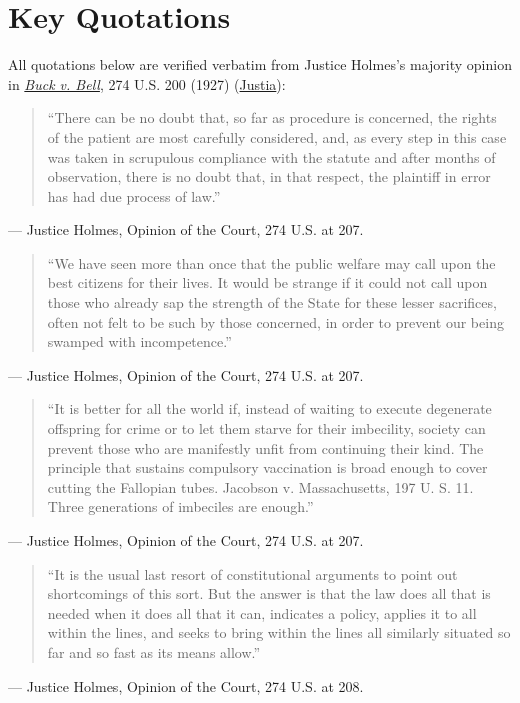 \documentclass[12pt]{article}
\begin{document}
\section{Key Quotations}

All quotations below are verified verbatim from Justice Holmes's majority opinion in \href{https://www.courtlistener.com/opinion/101076/buck-v-bell/}{\textit{Buck v. Bell}}, 274 U.S. 200 (1927) (\href{https://supreme.justia.com/cases/federal/us/274/200/}{Justia}):

\begin{quote}
``There can be no doubt that, so far as procedure is concerned, the rights of the patient are most carefully considered, and, as every step in this case was taken in scrupulous compliance with the statute and after months of observation, there is no doubt that, in that respect, the plaintiff in error has had due process of law.''
\end{quote}
\noindent --- Justice Holmes, Opinion of the Court, 274 U.S. at 207.

\begin{quote}
``We have seen more than once that the public welfare may call upon the best citizens for their lives. It would be strange if it could not call upon those who already sap the strength of the State for these lesser sacrifices, often not felt to be such by those concerned, in order to prevent our being swamped with incompetence.''
\end{quote}
\noindent --- Justice Holmes, Opinion of the Court, 274 U.S. at 207.

\begin{quote}
``It is better for all the world if, instead of waiting to execute degenerate offspring for crime or to let them starve for their imbecility, society can prevent those who are manifestly unfit from continuing their kind. The principle that sustains compulsory vaccination is broad enough to cover cutting the Fallopian tubes. Jacobson v. Massachusetts, 197 U. S. 11. Three generations of imbeciles are enough.''
\end{quote}
\noindent --- Justice Holmes, Opinion of the Court, 274 U.S. at 207.

\begin{quote}
``It is the usual last resort of constitutional arguments to point out shortcomings of this sort. But the answer is that the law does all that is needed when it does all that it can, indicates a policy, applies it to all within the lines, and seeks to bring within the lines all similarly situated so far and so fast as its means allow.''
\end{quote}
\noindent --- Justice Holmes, Opinion of the Court, 274 U.S. at 208.
\end{document}

